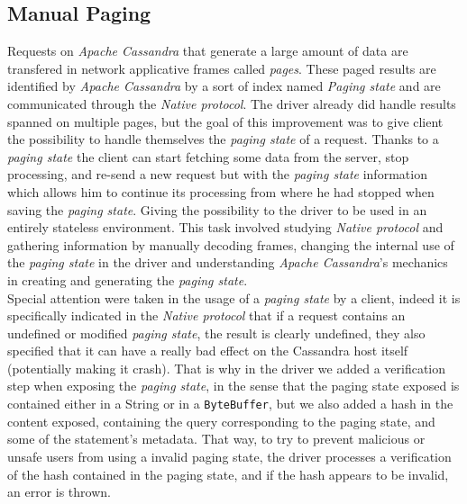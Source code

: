 \documentclass[a4paper]{report}
\newcommand{\ca}{\emph{Apache Cassandra\xspace}}
\begin{document}
\subsection{Manual Paging}
Requests on \ca{} that generate a large amount of data are transfered in network applicative frames called \emph{pages}. These paged results are identified by \ca{} by a sort of index named \emph{Paging state} and are communicated through the \emph{Native protocol}. The driver already did handle results spanned on multiple pages, but the goal of this improvement was to give client the possibility to handle themselves the \emph{paging state} of a request. Thanks to a \emph{paging state} the client can start fetching some data from the server, stop processing, and re-send a new request but with the \emph{paging state} information which allows him to continue its processing from where he had stopped when saving the \emph{paging state}. Giving the possibility to the driver to be used in an entirely stateless environment. This task involved studying \emph{Native protocol} and gathering information by manually decoding frames, changing the internal use of the \emph{paging state} in the driver and understanding \ca{}'s mechanics in creating and generating the \emph{paging state}.\\
Special attention were taken in the usage of a \emph{paging state} by a client, indeed it is specifically indicated in the \emph{Native protocol} that if a request contains an undefined or modified \emph{paging state}, the result is clearly undefined, they also specified that it can have a really bad effect on the Cassandra host itself (potentially making it crash). That is why in the driver we added a verification step when exposing the \emph{paging state}, in the sense that the paging state exposed is contained either in a String or in a \verb;ByteBuffer;, but we also added a hash in the content exposed, containing the query corresponding to the paging state, and some of the statement's metadata. That way, to try to prevent malicious or unsafe users from using a invalid paging state, the driver processes a verification of the hash contained in the paging state, and if the hash appears to be invalid, an error is thrown.
\end{document}
